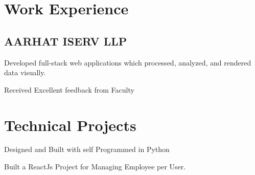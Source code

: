 \documentclass[]{deedy-resume-openfont}
\begin{document}
\begin{minipage}[t]{0.5\textwidth} 


\section{Work Experience}
\subsection{AARHAT ISERV LLP}
\vspace{\topsep} %
\begin{tightemize}
\item Developed full-stack web applications which processed, analyzed, and rendered data visually.
\item Received Excellent feedback from Faculty
\end{tightemize}
\sectionsep

\section{Technical Projects}

\vspace{\topsep} 
\begin{tightemize}
\item Designed and Built with self Programmed in Python
\end{tightemize}
\sectionsep





\vspace{\topsep} %
\begin{tightemize}
\item Built a ReactJs Project for Managing Employee per User.
\end{tightemize}
\sectionsep






\end{minipage}
\end{document}

